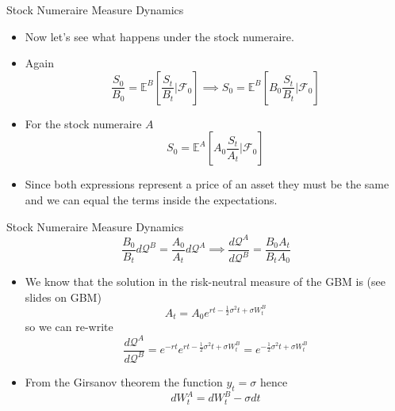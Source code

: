 \documentclass{beamer}
\begin{document}
\begin{frame}{Stock Numeraire Measure Dynamics}
	\begin{itemize}
	\item Now let's see what happens under the stock numeraire.
	\item Again 
	\begin{equation*}
	\frac{S_0}{B_0} = \mathbb{E}^B\left[\frac{S_t}{B_t}\bigg|\mathcal{F}_0\right] \implies
	S_0 = \mathbb{E}^B\left[B_0\frac{S_t}{B_t}\bigg|\mathcal{F}_0\right]
	\end{equation*}
	\item For the stock numeraire $A$
	\begin{equation*}
	S_0 = \mathbb{E}^A\left[A_0\frac{S_t}{A_t}\bigg|\mathcal{F}_0\right]
	\end{equation*}
	\item Since both expressions represent a price of an asset they must be the same and we can equal the terms inside the expectations.
\end{itemize}
\end{frame}

\begin{frame}{Stock Numeraire Measure Dynamics}
	\begin{equation*}
	\frac{B_0}{B_t}d\mathcal{Q}^B = \frac{A_0}{A_t}d\mathcal{Q}^A\implies \frac{d\mathcal{Q}^A}{d\mathcal{Q}^B}=\frac{B_0A_t}{B_tA_0}
	\end{equation*}
	\begin{itemize}
	\item We know that the solution in the risk-neutral measure of the GBM is (see slides on GBM)
	\begin{equation*} 
	A_t = A_0 e^{rt-\frac{1}{2}\sigma^2 t + \sigma W^B_t}
	\end{equation*}
	so we can re-write
	\begin{equation*}
	\frac{d\mathcal{Q}^A}{d\mathcal{Q}^B}=e^{-rt}e^{rt-\frac{1}{2}\sigma^2 t + \sigma W^B_t}=e^{-\frac{1}{2}\sigma^2 t + \sigma W^B_t}
	\end{equation*}
	\item From the Girsanov theorem the function $y_t = \sigma$ hence
	\begin{equation*}
	dW_t^A = dW_t^B - \sigma dt 
	\end{equation*}
\end{itemize}
\end{frame}
\end{document}
